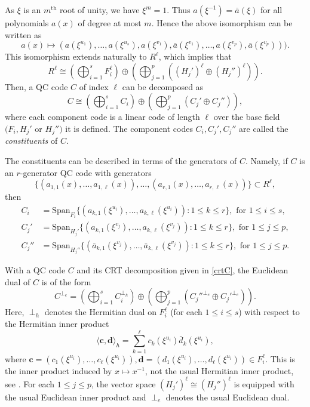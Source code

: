 \documentclass[a4paper,12pt]{article}
\begin{document}
As $\xi$ is an $m^{\mathrm{th}}$ root of unity, we have $\xi^m=1$. Thus  $a(\xi^{-1})=\bar{a}(\xi)$ for all polynomials $a(x)$ of degree at most $m$. Hence the above isomorphism can be written as 
\[
a(x) \mapsto \left(a(\xi^{u_1}), \dots, a(\xi^{u_s}),a(\xi^{v_1}),\bar{a}(\xi^{v_1}), \dots, a(\xi^{v_p}),\bar{a}(\xi^{v_p})\right)). 
\]
This isomorphism extends naturally to  $R^\ell$, which implies that
 $$
R^\ell \cong \left(\bigoplus_{i=1}^{s} F_i^\ell \right) 
\oplus
\left(\bigoplus_{j=1}^{p} \left( (H_j')^\ell
\oplus  (H_j'')^\ell  \right) \right).
 $$ 
Then, a QC code $C$ of index $\ell$ can be  decomposed as 
\begin{equation} \label{crtC}
C \cong \left(\bigoplus_{i=1}^{s} C_i \right) 
\oplus
\left(\bigoplus_{j=1}^{p} \left(  C_j' 
\oplus   C_j''   \right) \right), 
\end{equation} 
where each component code is a linear code of length $\ell$ over the base field $(F_i, H_j'$ or $H_j'')$ it is defined.  The component codes  $C_i, C_j', C_j''$ are called the \textit{constituents} of $C$.

The constituents can be described in terms of the generators of $C$. Namely, if $ C$ is an $r$-generator QC code with generators
\[
 \{ (a_{1,1}(x),\dots ,a_{1,\ell}(x)) ,\dots, (a_{r,1}(x),\dots,a_{r,\ell} (x) ) \} \subset R^\ell,
\]
then 
\begin{align*}
C_i &= \text{Span}_{F_i} \{ (a_{k,1}(\xi^{u_i}),\dots ,a_{k,\ell}(\xi^{u_i})) : 1 \le k \le r \}, \text{ for } 1 \le i \le s, \\
C_j' &= \text{Span}_{H_j'} \{ (a_{k,1}(\xi^{v_j}),\dots ,a_{k,\ell}(\xi^{v_j})) : 1 \le k \le r \}, \text{ for } 1 \le j \le p, \\
C_j'' &= \text{Span}_{H_j''} \{ (\bar{a}_{k,1}(\xi^{v_j}),\dots ,\bar{a}_{k,\ell}(\xi^{v_j})) : 1 \le k \le r \}, \text{ for } 1 \le j \le p.
\end{align*}


With a QC code $C$ and its CRT decomposition given in \eqref{crtC}, the Euclidean dual of $C$ is of the form 
\begin{equation} \label{crtCdual}
C^{\perp_e} = \left(\bigoplus_{i=1}^{s} C_i^{\perp_h} \right) 
\oplus
\left(\bigoplus_{j=1}^{p} \left(  C_j''^{\perp_e}
\oplus   C_j'^{\perp_e}   \right) \right).
\end{equation} 
Here, ${\perp_h}$ denotes the Hermitian dual on $F_i^\ell$ (for each $1\le i \le s$) with respect to  the Hermitian inner product
\begin{equation}\label{hinnerproduct}
	\langle \textbf{c},\textbf{d} \rangle_h= \sum_{k=1}^\ell c_k(\xi^{u_i})\bar{d}_k(\xi^{u_i}),
\end{equation}
where
$
\textbf{c} = (c_1(\xi^{u_i}), \dots,  c_\ell(\xi^{u_i})), \textbf{d} = (d_1(\xi^{u_i}), \dots,  d_\ell(\xi^{u_i})) \in F_i^\ell.
$ 
This is the inner product induced by $x\mapsto x^{-1}$, not the usual Hermitian inner product, see \cite[p. 2693]{ling2005}.  For each $1 \le j \le p$, the vector space $(H_j')^\ell \cong (H_j'')^\ell$ is equipped with the usual Euclidean inner product and ${\perp_e}$ denotes the usual Euclidean dual. 
\end{document}
